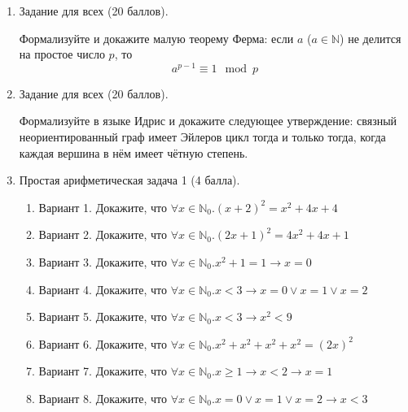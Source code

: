 \documentclass[10pt,a4paper,oneside]{article}
\begin{document}
\begin{enumerate}
\item Задание для всех (20 баллов).

Формализуйте и докажите малую теорему Ферма: если $a$ ($a \in \mathbb{N}$) не делится на простое число $p$,
то $$a^{p-1} \equiv 1 \mod p$$

\item Задание для всех (20 баллов).

Формализуйте в языке Идрис и докажите следующее утверждение: связный неориентированный
граф имеет Эйлеров цикл тогда и только тогда, когда каждая вершина в нём имеет чётную степень.

\item Простая арифметическая задача 1 (4 балла).
\begin{enumerate}
\item Вариант 1.
Докажите, что $\forall x\in\mathbb{N}_0.(x+2)^2 = x^2 + 4x + 4$
\item Вариант 2.
Докажите, что $\forall x\in\mathbb{N}_0.(2x+1)^2 = 4x^2 + 4x + 1$
\item Вариант 3.
Докажите, что $\forall x\in\mathbb{N}_0.x^2 + 1 = 1 \rightarrow x = 0$
\item Вариант 4.
Докажите, что $\forall x\in\mathbb{N}_0.x < 3 \rightarrow x = 0 \vee x = 1 \vee x = 2$
\item Вариант 5.
Докажите, что $\forall x\in\mathbb{N}_0.x < 3 \rightarrow x^2 < 9$
\item Вариант 6.
Докажите, что $\forall x\in\mathbb{N}_0.x^2 + x^2 + x^2 + x^2 = (2x)^2$
\item Вариант 7.
Докажите, что $\forall x\in\mathbb{N}_0.x \ge 1 \rightarrow x < 2 \rightarrow x = 1$
\item Вариант 8.
Докажите, что $\forall x\in\mathbb{N}_0.x = 0 \vee x = 1 \vee x = 2 \rightarrow x < 3$
\end{enumerate}

\end{enumerate}
\end{document}

